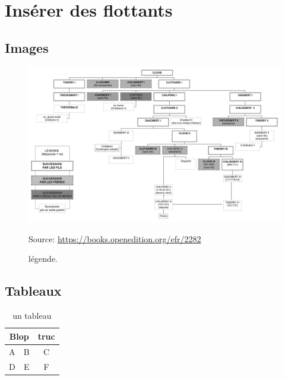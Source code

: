 \documentclass[12pt,a4paper]{article}
\begin{document}
	
\section{Insérer des flottants}
\subsection{Images}


\begin{landscape}
\begin{figure}[p]
\includegraphics{genealogie.jpg}
\caption{légende.}
Source: \url{https://books.openedition.org/efr/2282}
\end{figure}
\end{landscape}

\subsection{Tableaux}

\begin{table}
\begin{tabular}{|c|c|c|}
	\hline
	\multicolumn{2}{|c|}{Blop} & truc \\
	\hline
	A & B & C \\
	\hline
	D & E & F \\
	\hline
\end{tabular}
	\caption{un tableau}
\end{table}
\end{document}
